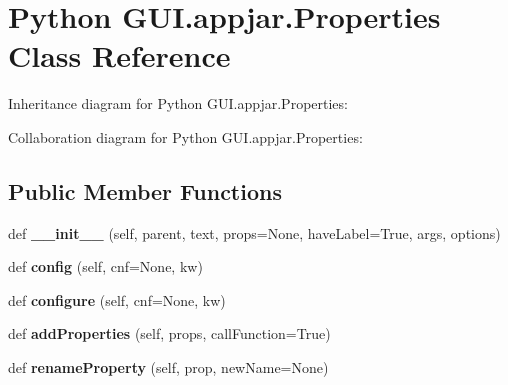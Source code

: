 \hypertarget{class_python_01_g_u_i_1_1appjar_1_1_properties}{}\section{Python G\+U\+I.\+appjar.\+Properties Class Reference}
\label{class_python_01_g_u_i_1_1appjar_1_1_properties}


Inheritance diagram for Python G\+U\+I.\+appjar.\+Properties\+:


Collaboration diagram for Python G\+U\+I.\+appjar.\+Properties\+:
\subsection*{Public Member Functions}
\begin{DoxyCompactItemize}
\item 
\mbox{\label{class_python_01_g_u_i_1_1appjar_1_1_properties_a6272115b5fb7fe108059e4321eb92325}} 
def {\bfseries \+\_\+\+\_\+init\+\_\+\+\_\+} (self, parent, text, props=None, have\+Label=True, args, options)
\item 
\mbox{\label{class_python_01_g_u_i_1_1appjar_1_1_properties_a39afd24822432648b79b1a00b3a63a1e}} 
def {\bfseries config} (self, cnf=None, kw)
\item 
\mbox{\label{class_python_01_g_u_i_1_1appjar_1_1_properties_ad3afa6c8decfac9a72635b4a27596adb}} 
def {\bfseries configure} (self, cnf=None, kw)
\item 
\mbox{\label{class_python_01_g_u_i_1_1appjar_1_1_properties_a9ab4d9f0ff899c46b06bc405b74fd6e5}} 
def {\bfseries add\+Properties} (self, props, call\+Function=True)
\item 
\mbox{\label{class_python_01_g_u_i_1_1appjar_1_1_properties_aad8b147e0a2deb0425b9c49565e04da4}} 
def {\bfseries rename\+Property} (self, prop, new\+Name=None)
\item 
\mbox{\label{class_python_01_g_u_i_1_1appjar_1_1_properties_a976793a01120260f7344d2ddc7011361}} 

\end{DoxyCompactItemize}
